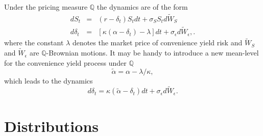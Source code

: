 \documentclass[a4paper,11pt]{article}
\newcommand{\sigmaS}{\sigma_S}
\newcommand{\sigmaE}{\sigma_\epsilon}
\begin{document}
Under the pricing measure $\mathbb{Q}$ the dynamics are of the form
\begin{eqnarray}
  dS_t &=& (r - \delta_t) S_t dt + \sigmaS S_t
  d\widetilde{W}_S   \label{eq:Qdynamics-S} \\
  d\delta_t &=& [\kappa (\alpha - \delta_t) - \lambda] dt + \sigmaE
  d\widetilde{W}_\epsilon, \label{eq:Qdynamics-delta}.
\end{eqnarray}
where the constant $\lambda$ denotes the market price of convenience
yield risk and $\widetilde{W}_S$ and $\widetilde{W}_\epsilon$ are
$\mathbb{Q}$-Brownian motions. It may be handy to introduce a new
mean-level for the convenience yield process under $\mathbb{Q}$
\begin{equation}
  \label{eq:Q-drift}
 \tilde{\alpha} = \alpha - \lambda / \kappa,
\end{equation}
which leads to the dynamics
\begin{equation}
d\delta_t = \kappa (\tilde{\alpha} - \delta_t) dt + \sigmaE
  d\widetilde{W}_\epsilon.
\end{equation}
\section{Distributions}\label{sec:distributions}
\end{document}
